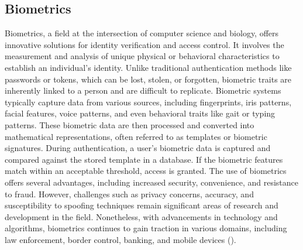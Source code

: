 \documentclass[
]{article}
\begin{document}
\begin{multicols}{2}

\section{Biometrics}
Biometrics, a field at the intersection of computer science and biology, offers innovative solutions for identity verification and access control. It involves the measurement and analysis of unique physical or behavioral characteristics to establish an individual's identity. Unlike traditional authentication methods like passwords or tokens, which can be lost, stolen, or forgotten, biometric traits are inherently linked to a person and are difficult to replicate. Biometric systems typically capture data from various sources, including fingerprints, iris patterns, facial features, voice patterns, and even behavioral traits like gait or typing patterns. These biometric data are then processed and converted into mathematical representations, often referred to as templates or biometric signatures. During authentication, a user's biometric data is captured and compared against the stored template in a database. If the biometric features match within an acceptable threshold, access is granted. The use of biometrics offers several advantages, including increased security, convenience, and resistance to fraud. However, challenges such as privacy concerns, accuracy, and susceptibility to spoofing techniques remain significant areas of research and development in the field. Nonetheless, with advancements in technology and algorithms, biometrics continues to gain traction in various domains, including law enforcement, border control, banking, and mobile devices (\cite{wang2023introduction}).


\end{multicols}
\end{document}
